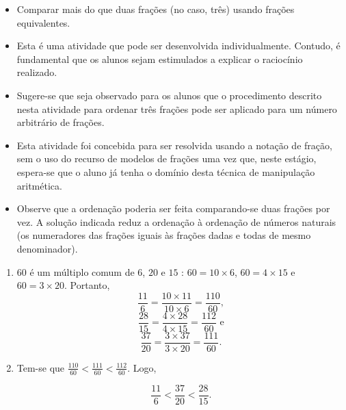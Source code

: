 \clearpage


\begin{atividade}\label{chap4-ativ18}
\objetivos
\begin{itemize} %
    \item       Comparar mais do que duas frações (no caso, três) usando frações
equivalentes.
\end{itemize} %

\discussoes
\begin{itemize} %
    \item       Esta é uma atividade que pode ser desenvolvida individualmente.
Contudo, é fundamental que os alunos sejam estimulados a explicar o raciocínio
realizado.
    \item       Sugere-se que seja observado para os alunos que o procedimento
descrito nesta atividade para ordenar três frações pode ser aplicado para um
número arbitrário de frações.
    \item       Esta atividade foi concebida para ser resolvida usando a notação
de fração, sem o uso do recurso de modelos de frações uma vez que, neste
estágio, espera-se que o aluno já tenha o domínio desta técnica de manipulação
aritmética.
    \item       Observe que a ordenação poderia ser feita comparando-se duas
frações por vez. A solução indicada reduz a ordenação à ordenação de números
naturais (os numeradores das frações iguais às frações dadas e todas de mesmo
denominador).
\end{itemize} %

\solucao
\begin{enumerate} %
    \item             $60$       é um múltiplo comum de       $6$,       $20$
   e       $15$      :       $60 = 10 \times 6$,       $60 = 4 \times 15$
e       $60 = 3 \times 20$. Portanto,     
$$\frac{11}{6} = \frac{10 \times11}{10 \times 6} = \frac{110}{60},$$    
$$\frac{28}{15} = \frac{4\times 28}{4 \times 15} = \frac{112}{60} \text{ e}$$
$$\frac{37}{20} = \frac{3 \times 37}{3 \times 20} = \frac{111}{60}.$$

    \item       Tem-se que       $\frac{110}{60} < \frac{111}{60} <
\frac{112}{60}$. Logo,

  $$\frac{11}{6} < \frac{37}{20} < \frac{28}{15}.$$
\end{enumerate} %

\end{atividade}

